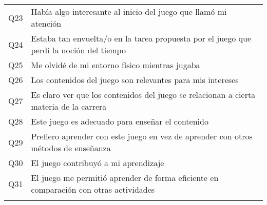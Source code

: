 \begin{table}[h]
\begin{tabular}{|c|l|}
Q23      & Había algo interesante al inicio del juego que llamó mi atención \\
Q24      & Estaba tan envuelta/o en la tarea propuesta por el juego que perdí la noción del tiempo \\
Q25      & Me olvidé de mi entorno físico mientras jugaba \\
Q26      & Los contenidos del juego son relevantes para mis intereses \\
Q27      & Es claro ver que los contenidos del juego se relacionan a cierta materia de la carrera \\
Q28      & Este juego es adecuado para enseñar el contenido \\
Q29      & Prefiero aprender con este juego en vez de aprender con otros métodos de enseñanza \\
Q30      & El juego contribuyó a mi aprendizaje \\
Q31      & El juego me permitió aprender de forma eficiente en comparación con otras actividades \\
& \\

\hline
\end{tabular}
\end{table}

\restoregeometry
